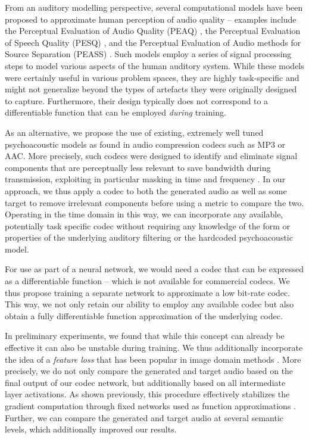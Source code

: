 \documentclass[sigconf]{acmart}
\begin{document}
From an auditory modelling perspective, several computational models have been proposed to approximate human perception of audio quality -- examples include the Perceptual Evaluation of Audio Quality (PEAQ) \cite{peaq}, the Perceptual Evaluation of Speech Quality (PESQ) \cite{pesq}, and the Perceptual Evaluation of Audio methods for Source Separation (PEASS) \cite{peass}.  Such models employ a series of signal processing steps to model various aspects of the human auditory system.  While these models were certainly useful in various problem spaces, they are highly task-specific and might not generalize beyond the types of artefacts they were originally designed to capture. Furthermore, their design typically does not correspond to a differentiable function that can be employed \textit{during} training.

As an alternative, we propose the use of existing, extremely well tuned psychoacoustic models as found in audio compression codecs such as MP3 or AAC. More precisely, such codecs were designed to identify and eliminate signal components that are perceptually less relevant to save bandwidth during transmission, exploiting in particular masking in time and frequency \cite{coding}. In our approach, we thus apply a codec to both the generated audio as well as some target to remove irrelevant components before using a metric to compare the two. Operating in the time domain in this way, we can incorporate any available, potentially task specific codec without requiring any knowledge of the form or properties of the underlying auditory filtering or the hardcoded psychoacoustic model.


For use as part of a neural network, we would need a codec that can be expressed as a differentiable function -- which is not available for commercial codecs. 
We thus propose training a separate network to approximate a low bit-rate codec. This way, we not only retain our ability to employ any available codec but also obtain a fully differentiable function approximation of the underlying codec.

In preliminary experiments, we found that while this concept can already be effective it can also be unstable during training. We thus additionally incorporate the idea of a \emph{feature loss} that has been popular in image domain methods \cite{style1, style2}. More precisely, we do not only compare the generated and target audio based on the final output of our codec network, but additionally based on all intermediate layer activations. As shown previously, this procedure effectively stabilizes the gradient computation through fixed networks used as function approximations \cite{deepsim}. Further, we can compare the generated and target audio at several semantic levels, which additionally improved our results.
\end{document}
